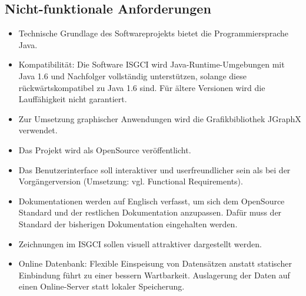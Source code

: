 \documentclass[11pt,a4paper]{article}
\begin{document}
	\subsection{Nicht-funktionale Anforderungen} %
		\begin{itemize}
		\item Technische Grundlage des Softwareprojekts bietet die Programmiersprache Java.
		\item Kompatibilität: Die Software ISGCI wird Java-Runtime-Umgebungen mit Java 1.6 und Nachfolger vollständig unterstützen, solange diese rückwärtskompatibel zu Java 1.6 sind. Für ältere Versionen wird die Lauffähigkeit nicht garantiert.
		\item Zur Umsetzung graphischer Anwendungen wird die Grafikbibliothek JGraphX verwendet.
		\item Das Projekt wird als OpenSource veröffentlicht.
		\item Das Benutzerinterface soll interaktiver und userfreundlicher sein als bei der Vorgängerversion (Umsetzung: vgl. Functional Requirements).
		\item Dokumentationen werden auf Englisch verfasst, um sich dem OpenSource Standard und der restlichen Dokumentation anzupassen. Dafür muss der Standard der bisherigen Dokumentation eingehalten werden.
		\item Zeichnungen im ISGCI sollen visuell attraktiver dargestellt werden.
		\item Online Datenbank: Flexible Einspeisung von Datensätzen anstatt statischer Einbindung führt zu einer bessern Wartbarkeit. Auslagerung der Daten auf einen Online-Server statt lokaler Speicherung.
		\end{itemize}
		
\end{document}
